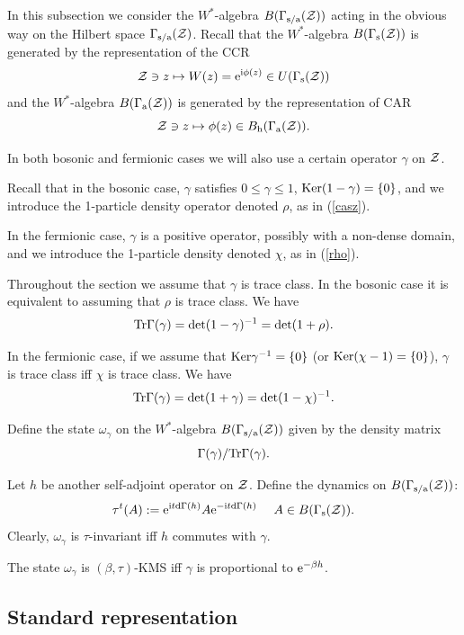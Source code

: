 \documentclass{svmult}
\def\s{{\rm s}}
\def\sa{{\rm s/a}}
\def\h{{\rm h}}
\def\cZ{{\cal Z}}
\def\a{{\rm a}}
\def\i{{\rm i}}
\def\Tr{{\rm Tr}}
\def\Ker{{\rm Ker}}
\def\e{{\rm e}}
\def\d{{\rm d}}
\def\Tr{{\rm Tr}}
\def\Ker{{\rm Ker}}
\def\e{{\rm e}}
\def\d{{\rm d}}
\def\s{{\rm s}}
\begin{document}
In this subsection we consider the $W^*$-algebra $B(\Gamma_\sa(\cZ))$ acting
in the obvious way on the Hilbert space
 $\Gamma_\sa(\cZ)$. Recall that  the $W^*$-algebra 
$B(\Gamma_\s(\cZ))$ is generated by the representation of the CCR
\[\cZ\ni z\mapsto W(z)=\e^{\i\phi(z)}\in U(\Gamma_\s(\cZ))\]
and 
the $W^*$-algebra 
$B(\Gamma_\a(\cZ))$ is generated by the representation of CAR
\[\cZ\ni z\mapsto \phi(z)\in B_\h(\Gamma_\a(\cZ)).\]



In both bosonic and fermionic cases we will also use
a certain operator $\gamma$ on $\cZ$. 

Recall that in the bosonic case, $\gamma$ satisfies $0\leq\gamma\leq1$,
$\Ker(1-\gamma)=\{0\}$, and we  introduce the 1-particle density operator
denoted $\rho$, as in (\ref{casz}).

 In  the fermionic case, $\gamma$ is a positive operator, possibly with a
 non-dense domain, and we introduce the
 1-particle density
denoted $\chi$, as in (\ref{rho}).


Throughout the section we assume that $\gamma$ is trace class.
In the bosonic case it is equivalent to assuming that $\rho$ is trace class.
We have
\[ \Tr\Gamma(\gamma)=\det(1-\gamma)^{-1}=
\det(1+\rho).\]




In the fermionic case, if we assume that $\Ker\gamma^{-1}=\{0\}$
 (or
$\Ker(\chi-1)=\{0\}$), $\gamma$ is trace class iff
 $\chi$ is trace class.
We have
\[ \Tr\Gamma(\gamma)=\det(1+\gamma)=
\det(1-\chi)^{-1}.\]

Define the state $\omega_\gamma$ on the $W^*$-algebra
  $B(\Gamma_\sa(\cZ))$ given by the density matrix
\[\Gamma(\gamma)/\Tr\Gamma(\gamma).\]


Let $h$ be another self-adjoint operator on $\cZ$.
Define the dynamics on $B(\Gamma_\sa(\cZ))$:
\[\tau^t(A):=\e^{\i t\d\Gamma(h)}A\e^{-\i t\d\Gamma(h)}\ \ \ \ 
A\in B(\Gamma_\s(\cZ)).\]
Clearly, $\omega_\gamma$ is $\tau$-invariant iff $h$  commutes  with $\gamma$.

The state $\omega_\gamma$ is  $(\beta,\tau)$-KMS iff 
$\gamma$ is proportional to $\e^{-\beta h}$.




\subsection{Standard representation}  

\label{a2.2}
\end{document}
